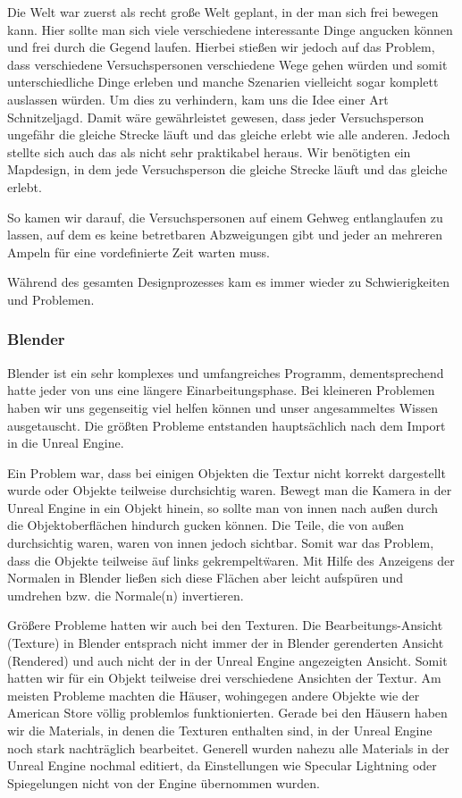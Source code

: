 \documentclass{Bericht}
\begin{document}
\newpage
		Die Welt war zuerst als recht große Welt geplant, in der man sich frei bewegen kann. Hier sollte man sich viele verschiedene interessante Dinge angucken können und frei durch die Gegend laufen. Hierbei stießen wir jedoch auf das Problem, dass verschiedene Versuchspersonen verschiedene Wege gehen würden und somit unterschiedliche Dinge erleben und manche Szenarien vielleicht sogar komplett auslassen würden. Um dies zu verhindern, kam uns die Idee einer Art Schnitzeljagd. Damit wäre gewährleistet gewesen, dass jeder Versuchsperson ungefähr die gleiche Strecke läuft und das gleiche erlebt wie alle anderen. Jedoch stellte sich auch das als nicht sehr praktikabel heraus. Wir benötigten ein Mapdesign, in dem jede Versuchsperson die gleiche Strecke läuft und das gleiche erlebt.

		So kamen wir darauf, die Versuchspersonen auf einem Gehweg entlanglaufen zu lassen, auf dem es keine betretbaren Abzweigungen gibt und jeder an mehreren Ampeln für eine vordefinierte Zeit warten muss. 
		
		Während des gesamten Designprozesses kam es immer wieder zu Schwierigkeiten und Problemen.
		
		\subsubsection{Blender}
			Blender ist ein sehr komplexes und umfangreiches Programm, dementsprechend hatte jeder von uns eine längere Einarbeitungsphase. Bei kleineren Problemen haben wir uns gegenseitig viel helfen können und unser angesammeltes Wissen ausgetauscht. Die größten Probleme entstanden hauptsächlich nach dem Import in die Unreal Engine. 

			Ein Problem war, dass bei einigen Objekten die Textur nicht korrekt dargestellt wurde oder Objekte teilweise durchsichtig waren. Bewegt man die Kamera in der Unreal Engine in ein Objekt hinein, so sollte man von innen nach außen durch die Objektoberflächen hindurch gucken können. Die Teile, die von außen durchsichtig waren, waren von innen jedoch sichtbar. Somit war das Problem, dass die Objekte teilweise \"auf links gekrempelt\" waren. Mit Hilfe des Anzeigens der Normalen in Blender ließen sich diese Flächen aber leicht aufspüren und umdrehen bzw. die Normale(n) invertieren.
			
			Größere Probleme hatten wir auch bei den Texturen. Die Bearbeitungs-Ansicht (Texture) in Blender entsprach nicht immer der in Blender gerenderten Ansicht (Rendered) und auch nicht der in der Unreal Engine angezeigten Ansicht. Somit hatten wir für ein Objekt teilweise drei verschiedene Ansichten der Textur. Am meisten Probleme machten die Häuser, wohingegen andere Objekte wie der American Store völlig problemlos funktionierten. Gerade bei den Häusern haben wir die Materials, in denen die Texturen enthalten sind, in der Unreal Engine noch stark nachträglich bearbeitet.
			Generell wurden nahezu alle Materials in der Unreal Engine nochmal editiert, da Einstellungen wie Specular Lightning oder Spiegelungen nicht von der Engine übernommen wurden.
			
\end{document}
